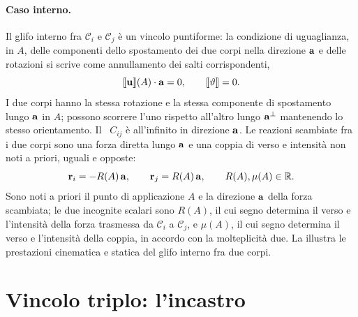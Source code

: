\paragraph{Caso interno.}
Il glifo interno fra $\mathcal{C}_i$ e $\mathcal{C}_j$ è un
vincolo puntiforme: la condizione di uguaglianza, in $A$,
delle componenti dello spostamento dei due corpi nella
direzione $\mathbf{a}$ e delle rotazioni si scrive come annullamento
dei salti corrispondenti,
\begin{equation}\label{eq:glifo_int}
	\llbracket \mathbf{u} \rrbracket(A) \cdot \mathbf{a} = 0,
	\qquad
	\llbracket \vartheta \rrbracket = 0.
\end{equation}
I due corpi hanno la stessa rotazione e la stessa componente
di spostamento lungo $\mathbf{a}$ in $A$; possono scorrere l'uno
rispetto all'altro lungo $\mathbf{a}^{\perp}$ mantenendo lo stesso
orientamento. Il \CRr\ $C_{ij}$ è all'infinito in direzione
$\mathbf{a}$. Le reazioni scambiate fra i due corpi sono una forza
diretta lungo $\mathbf{a}$ e una coppia di verso e intensità non
noti a priori, uguali e opposte:
\begin{equation}\label{eq:reazione_glifo_int}
	\mathbf{r}_i = -R(A)\,\mathbf{a},
	\qquad
	\mathbf{r}_j = R(A)\,\mathbf{a},
	\qquad
	R(A), \mu(A) \in \mathbb{R}.
\end{equation}
Sono noti a priori il punto di applicazione $A$ e la
direzione $\mathbf{a}$ della forza scambiata; le due incognite
scalari sono $R(A)$, il cui segno determina il verso e
l'intensità della forza trasmessa da $\mathcal{C}_i$ a
$\mathcal{C}_j$, e $\mu(A)$, il cui segno determina il
verso e l'intensità della coppia, in accordo con la
molteplicità due. La  illustra
le prestazioni cinematica e statica del glifo interno fra
due corpi.








\section{Vincolo triplo: l'incastro}\label{sec:incastro}

